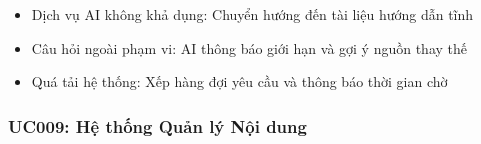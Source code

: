 \begin{usecase}
{\begin{itemize}
    \item Dịch vụ AI không khả dụng: Chuyển hướng đến tài liệu hướng dẫn tĩnh
    \item Câu hỏi ngoài phạm vi: AI thông báo giới hạn và gợi ý nguồn thay thế
    \item Quá tải hệ thống: Xếp hàng đợi yêu cầu và thông báo thời gian chờ
\end{itemize}}
\end{usecase}

\subsubsection{UC009: Hệ thống Quản lý Nội dung}

